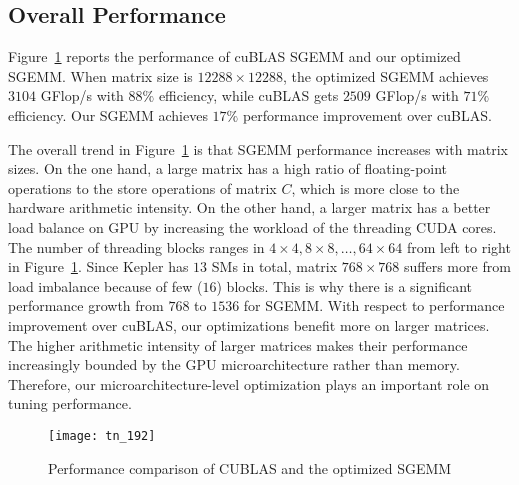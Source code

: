 \subsection{Overall Performance}
Figure~\ref{fig:sgemm_tn} reports the performance of cuBLAS SGEMM and our optimized SGEMM.
When matrix size is $12288\times12288$, the optimized SGEMM achieves $3104$ GFlop/s with $88\%$ efficiency, while cuBLAS gets $2509$ GFlop/s with $71\%$ efficiency. 
Our SGEMM achieves $17\%$ performance improvement over cuBLAS.

The overall trend in Figure~\ref{fig:sgemm_tn} is that SGEMM performance increases with matrix sizes. 
On the one hand, a large matrix has a high ratio of 
floating-point operations to the store operations of matrix $C$, which is more close to the hardware arithmetic intensity. 
On the other hand, a larger matrix has a better load balance on GPU by increasing the workload of the threading CUDA
cores.
The number of threading blocks ranges in $4 \times 4, 8 \times 8, \dots, 64 \times 64$ from left to right in Figure~\ref{fig:sgemm_tn}.
Since Kepler has $13$ SMs in total, matrix $768\times 768$ suffers more from load imbalance because of few ($16$) blocks. 
This is why there is a significant performance growth from $768$ to $1536$ for SGEMM. 
With respect to performance improvement over cuBLAS, our optimizations benefit more on larger matrices. 
The higher arithmetic intensity of larger matrices makes their performance increasingly bounded by the GPU microarchitecture rather than memory. 
Therefore, our microarchitecture-level optimization plays an important role on tuning 
performance.

\begin{figure}[htbp]
\begin{center}
\texttt{[image: tn\_192]}
\caption{Performance comparison of CUBLAS and the optimized SGEMM }
\label{fig:sgemm_tn}
\end{center}
\end{figure}


